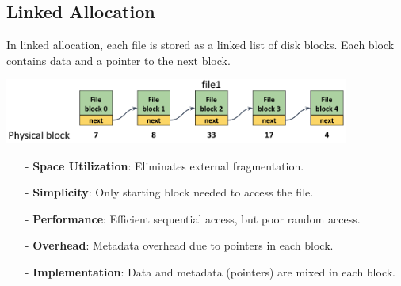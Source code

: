 \subsection{Linked Allocation}
In linked allocation, each file is stored as a linked list of disk blocks. Each block contains data and a pointer to the next block.
\begin{center}
  \includegraphics[width=0.85\textwidth]{chapters/L6/images/linked.png}
\end{center}
\begin{itemize}[itemsep=2pt, topsep=1pt]
    \item[-] \textbf{Space Utilization}: Eliminates external fragmentation.
    \item[-] \textbf{Simplicity}: Only starting block needed to access the file.
    \item[-] \textbf{Performance}: Efficient sequential access, but poor random access.
    \item[-] \textbf{Overhead}: Metadata overhead due to pointers in each block.
    \item[-] \textbf{Implementation}: Data and metadata (pointers) are mixed in each block.
\end{itemize}

\newpage

